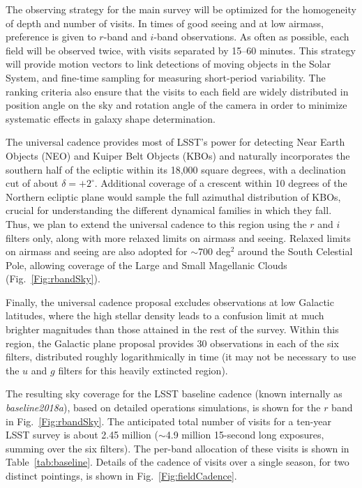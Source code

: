 The observing strategy for the main survey will be optimized for the homogeneity
of depth and number of visits. In times of good seeing and at low airmass, preference
is given to $r$-band and $i$-band observations. As often as possible, each field will be
observed twice, with visits separated by 15--60 minutes. This strategy will provide motion
vectors to link detections of moving objects in the Solar System, and fine-time sampling
for measuring short-period variability. The ranking criteria also ensure that the
visits to each field are widely distributed in position angle on the sky and
rotation angle of the camera in order to minimize systematic effects in galaxy shape
determination.

The universal cadence provides most of LSST's power for detecting Near Earth
Objects (NEO) and Kuiper Belt Objects (KBOs) and naturally
incorporates the southern half of the ecliptic
within its 18,000 square degrees, with a declination cut of about
$\delta = +2^\circ$.  Additional coverage of a crescent within 10
degrees of the Northern
ecliptic plane would sample the full azimuthal distribution of KBOs,
crucial for understanding the different dynamical families in which
they fall.
Thus, we plan to extend
 the universal cadence to this region using the
$r$ and $i$ filters only, along
with more relaxed limits on airmass and seeing. Relaxed limits on airmass and
seeing are also adopted for $\sim$700 deg$^2$ around the South Celestial
Pole, allowing coverage of the Large and Small Magellanic Clouds
(Fig.~\ref{Fig:rbandSky}).

Finally, the universal cadence proposal excludes observations at low
Galactic latitudes, where the high stellar
density leads to a confusion limit at much brighter magnitudes than those
attained in the rest of the survey. Within this region, the Galactic plane
proposal provides 30 observations in each of the six filters, distributed
roughly logarithmically in time (it may not be necessary to use the
$u$ and $g$ filters for this heavily extincted region).

The resulting sky coverage for the LSST baseline cadence (known internally as
\textit{baseline2018a}), based on detailed operations simulations, is shown for the
$r$ band in Fig.~\ref{Fig:rbandSky}. The anticipated total number of visits
for a ten-year LSST survey  is about 2.45 million ($\sim$4.9 million 15-second long
exposures, summing over the six filters). The per-band allocation of
these visits is shown in Table~\ref{tab:baseline}.  Details of the cadence of visits 
over a single season, for  two distinct pointings, is shown in Fig.~\ref{Fig:fieldCadence}.

